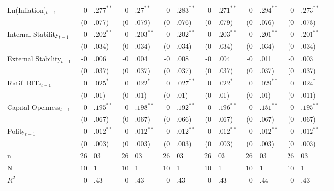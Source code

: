 \documentclass[12pt,onesided]{amsart}
\begin{document}
\begin{table}[ht]
{\begin{tabular}{lr@{} lr@{}lr@{}lr@{} lr@{}lr@{}lr@{} }
  Ln(Inflation)$_{t-1}$ & $-0$&$.277^{\ast\ast}$ & $-0$&$.27^{\ast\ast}$ & $-0$&$.283^{\ast\ast}$ & $-0$&$.271^{\ast\ast}$ & $-0$&$.294^{\ast\ast}$ & $-0$&$.273^{\ast\ast}$ \\ 
   & (0&.077) & (0&.079) & (0&.076) & (0&.079) & (0&.076) & (0&.078) \\ 
  Internal Stability$_{t-1}$ & $0$&$.202^{\ast\ast}$ & $0$&$.203^{\ast\ast}$ & $0$&$.202^{\ast\ast}$ & $0$&$.203^{\ast\ast}$ & $0$&$.201^{\ast\ast}$ & $0$&$.201^{\ast\ast}$ \\ 
   & (0&.034) & (0&.034) & (0&.034) & (0&.034) & (0&.034) & (0&.034) \\ 
  External Stability$_{t-1}$ & -0&.006 & -0&.004 & -0&.008 & -0&.004 & -0&.011 & -0&.003 \\ 
   & (0&.037) & (0&.037) & (0&.037) & (0&.037) & (0&.037) & (0&.037) \\ 
  Ratif. BITs$_{t-1}$ & $0$&$.025^{\ast}$ & $0$&$.022^{\ast}$ & $0$&$.027^{\ast\ast}$ & $0$&$.022^{\ast}$ & $0$&$.029^{\ast\ast}$ & $0$&$.024^{\ast}$ \\ 
   & (0&.01) & (0&.01) & (0&.01) & (0&.01) & (0&.01) & (0&.011) \\ 
  Capital Openness$_{t-1}$ & $0$&$.195^{\ast\ast}$ & $0$&$.198^{\ast\ast}$ & $0$&$.192^{\ast\ast}$ & $0$&$.196^{\ast\ast}$ & $0$&$.181^{\ast\ast}$ & $0$&$.195^{\ast\ast}$ \\ 
   & (0&.067) & (0&.067) & (0&.066) & (0&.067) & (0&.067) & (0&.067) \\ 
  Polity$_{t-1}$ & $0$&$.012^{\ast\ast}$ & $0$&$.012^{\ast\ast}$ & $0$&$.012^{\ast\ast}$ & $0$&$.012^{\ast\ast}$ & $0$&$.012^{\ast\ast}$ & $0$&$.012^{\ast\ast}$ \\ 
   & (0&.003) & (0&.003) & (0&.003) & (0&.003) & (0&.003) & (0&.003) \\ 
   \hline
n & 26&03 & 26&03 & 26&03 & 26&03 & 26&03 & 26&03 \\ 
  N & 10&1 & 10&1 & 10&1 & 10&1 & 10&1 & 10&1 \\ 
  $R^{2}$ & 0&.43 & 0&.43 & 0&.43 & 0&.43 & 0&.44 & 0&.43 \\ 
   \hline
\hline
\end{tabular}
}
\end{table}
\end{document}
